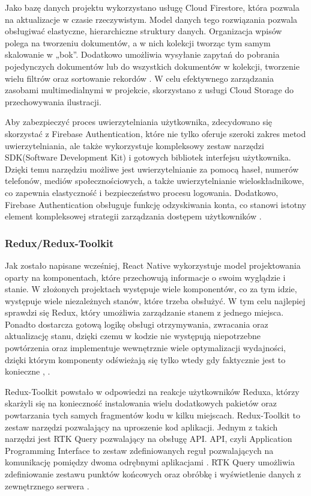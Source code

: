 Jako bazę danych projektu wykorzystano usługę Cloud Firestore, która pozwala na aktualizacje w czasie rzeczywistym. Model danych tego rozwiązania pozwala obsługiwać elastyczne, hierarchiczne struktury danych. Organizacja wpisów polega na tworzeniu dokumentów, a w nich kolekcji tworząc tym samym skalowanie w „bok”. Dodatkowo umożliwia wysyłanie zapytań do pobrania pojedynczych dokumentów lub do wszystkich dokumentów w kolekcji, tworzenie wielu filtrów oraz sortowanie rekordów \cite{storage}. W celu efektywnego zarządzania zasobami multimedialnymi w projekcie, skorzystano z usługi Cloud Storage do przechowywania ilustracji.

Aby zabezpieczyć proces uwierzytelniania użytkownika, zdecydowano się skorzystać z Firebase Authentication, które nie tylko oferuje szeroki zakres metod uwierzytelniania, ale także wykorzystuje kompleksowy zestaw narzędzi SDK(Software Development Kit) i gotowych bibliotek interfejsu użytkownika. Dzięki temu narzędziu możliwe jest uwierzytelnianie za pomocą haseł, numerów telefonów, mediów społecznościowych, a także uwierzytelnianie wieloskładnikowe, co zapewnia elastyczność i bezpieczeństwo procesu logowania. Dodatkowo, Firebase Authentication obsługuje funkcję odzyskiwania konta, co stanowi istotny element kompleksowej strategii zarządzania dostępem użytkowników \cite{authenticationase}.


\subsubsection*{\textbf{Redux/Redux-Toolkit}}
\phantom{th}
Jak zostało napisane wcześniej, React Native wykorzystuje model projektowania oparty
na komponentach, które przechowują informacje o swoim wyglądzie i stanie. W złożonych
projektach występuje wiele komponentów, co za tym idzie, występuje wiele niezależnych
stanów, które trzeba obsłużyć. W tym celu najlepiej sprawdzi się Redux, który umożliwia
zarządzanie stanem z jednego miejsca. Ponadto dostarcza gotową logikę obsługi
otrzymywania, zwracania oraz aktualizację stanu, dzięki czemu w kodzie nie występują
niepotrzebne powtórzenia oraz implementuje wewnętrznie wiele optymalizacji wydajności,
dzięki którym komponenty odświeżają się tylko wtedy gdy faktycznie jest to konieczne \cite{learningredux}, \cite{reactredux}.

Redux-Toolkit powstało w odpowiedzi na reakcje użytkowników Reduxa, którzy skarżyli się na konieczność instalowania wielu dodatkowych pakietów oraz powtarzania tych samych fragmentów kodu w kilku miejscach. Redux-Toolkit to zestaw narzędzi pozwalający na uproszenie kod aplikacji. Jednym z takich narzędzi jest RTK Query pozwalający na obsługę API. API, czyli Application Programming Interface to zestaw zdefiniowanych reguł pozwalających na komunikację pomiędzy dwoma odrębnymi aplikacjami \cite{api}. RTK Query umożliwia zdefiniowanie zestawu punktów końcowych oraz obróbkę i wyświetlenie danych z zewnętrznego serwera \cite{reduxtoolkit}.


